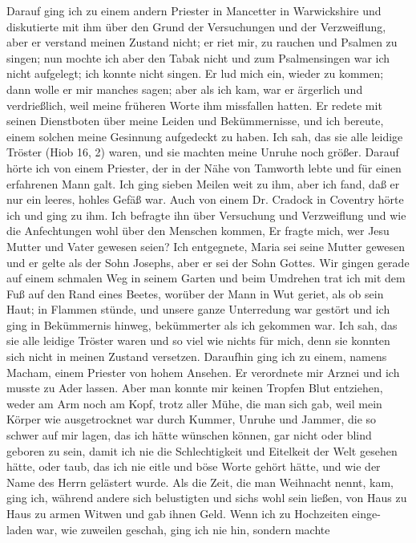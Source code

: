 Darauf ging ich zu einem andern Priester in Mancetter in
Warwickshire und diskutierte mit ihm über den Grund der Versuchungen 
und der Verzweiflung, aber er verstand meinen Zustand
nicht; er riet mir, zu rauchen und Psalmen zu singen; nun mochte
ich aber den Tabak nicht und zum Psalmensingen war ich nicht
aufgelegt; ich konnte nicht singen. Er lud mich ein, wieder zu
kommen; dann wolle er mir manches sagen; aber als ich kam,
war er ärgerlich und verdrießlich, weil meine früheren Worte ihm
missfallen hatten. Er redete mit seinen Dienstboten über meine
Leiden und Bekümmernisse, und ich bereute, einem solchen meine
Gesinnung aufgedeckt zu haben. Ich sah, das sie alle leidige
Tröster (Hiob 16, 2) waren, und sie machten meine Unruhe noch
größer. Darauf hörte ich von einem Priester, der in der Nähe
von Tamworth lebte und für einen erfahrenen Mann galt. Ich
ging sieben Meilen weit zu ihm, aber ich fand, daß er nur ein
leeres, hohles Gefäß war. Auch von einem Dr. Cradock in Coventry
hörte ich und ging zu ihm. Ich befragte ihn über Versuchung
und Verzweiflung und wie die Anfechtungen wohl über den
Menschen kommen, Er fragte mich, wer Jesu Mutter und Vater
gewesen seien? Ich entgegnete, Maria sei seine Mutter gewesen
und er gelte als der Sohn Josephs, aber er sei der Sohn Gottes.
Wir gingen gerade auf einem schmalen Weg in seinem Garten
und beim Umdrehen trat ich mit dem Fuß auf den Rand eines
Beetes, worüber der Mann in Wut geriet, als ob sein Haut; in
Flammen stünde, und unsere ganze Unterredung war gestört und
ich ging in Bekümmernis hinweg, bekümmerter als ich gekommen
war. Ich sah, das sie alle leidige Tröster waren und so viel
wie nichts für mich, denn sie konnten sich nicht in meinen Zustand
versetzen. Daraufhin ging ich zu einem, namens Macham, einem
Priester von hohem Ansehen. Er verordnete mir Arznei und ich
musste zu Ader lassen. Aber man konnte mir keinen Tropfen Blut
entziehen, weder am Arm noch am Kopf, trotz aller Mühe, die
man sich gab, weil mein Körper wie ausgetrocknet war
durch Kummer, Unruhe und Jammer, die so schwer auf mir
lagen, das ich hätte wünschen können, gar nicht oder blind geboren 
zu sein, damit ich nie die Schlechtigkeit und Eitelkeit der
Welt gesehen hätte, oder taub, das ich nie eitle und böse Worte
gehört hätte, und wie der Name des Herrn gelästert wurde. Als
die Zeit, die man Weihnacht nennt, kam, ging ich, während andere
sich belustigten und sichs wohl sein ließen, von Haus zu Haus zu
armen Witwen und gab ihnen Geld. Wenn ich zu Hochzeiten einge-
laden war, wie zuweilen geschah, ging ich nie hin, sondern machte
